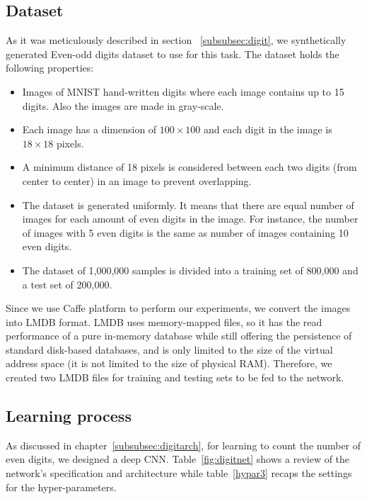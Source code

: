 \subsection{Dataset} 
As it was meticulously described in section ~\ref{subsubsec:digit}, we synthetically generated Even-odd digits dataset to use for this task. The dataset holds the following properties:
\begin{itemize}
\item Images of MNIST hand-written digits where each image contains up to 15 digits. Also the images are made in gray-scale.
\item Each image has a dimension of $100\times100$ and each digit in the image is $18\times18$ pixels.  
\item A minimum distance of 18 pixels is considered between each two digits (from center to center) in an image to prevent overlapping.
\item The dataset is generated uniformly. It means that there are equal number of images for each amount of even digits in the image. For instance, the number of images with 5 even digits is the same as number of images containing 10 even digits.
\item The dataset of 1,000,000 samples is divided into a training set of 800,000 and a test set of 200,000. 
\end{itemize}

Since we use Caffe platform to perform our experiments, we convert the images into LMDB format. LMDB uses memory-mapped files, so it has the read performance of a pure in-memory database while still offering the persistence of standard disk-based databases, and is only limited to the size of the virtual address space (it is not limited to the size of physical RAM). Therefore, we created two LMDB files for training and testing sets to be fed to the network.  

\subsection{Learning process}

As discussed in chapter~\ref{subsubsec:digitarch}, for learning to count the number of even digits, we designed a deep CNN. Table~\ref{fig:digitnet} shows a review of the network's specification and architecture while table~\ref{hypar3} recaps the settings for the hyper-parameters.



